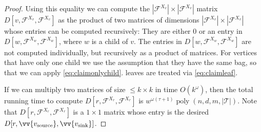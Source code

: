 \documentclass[10pt,a4paper]{article}
\numberwithin{equation}{section}
\theoremstyle{definition}
\newcommand{\CT}{\mathcal{T}}
\newcommand{\CF}{\mathcal{F}}
\DeclareMathOperator{\poly}{poly}
\begin{document}
\begin{proof}
Using this equality we can compute the $|\CF^{X_v}|\times|\CF^{X_v}|$ matrix $D[v,\CF^{X_v},\CF^{X_v}]$ as the product of two matrices of dimensions $|\CF^{X_v}|\times|\CF^{X_v}|$ whose entries can be computed recursively: They are either 0 or an entry in $D[w,\CF^{X_w},\CF^{X_w}]$, where $w$ is a child of $v$. The entries in $D[w,\CF^{X_w},\CF^{X_w}]$ are not computed individually, but recursively as a product of matrices.
For vertices that have only one child we use the assumption that they have the same bag, so that we can apply \eqref{eq:claimonlychild}. leaves are treated via \eqref{eq:claimleaf}.

If we can multiply two matrices of size $\leq k \times k$ in time $O(k^\omega)$, then the total running time to compute $D[r,\CF^{X_r},\CF^{X_r}]$ is $w^{\omega(\tau+1)}\poly(n,d,m, |\CT|)$. Note that $D[r,\CF^{X_r},\CF^{X_r}]$ is a $1 \times 1$ matrix whose entry is the desired $D[r,\vv{v_{\textup{source}}}, \vv{v_{\textup{sink}}}]$.
\end{proof}

%
%
%
%
%
%
%
%
%
%
%
%
%
%
%
%
%
%
%
%
%
%
%
%
%
%
%
%
%
%
%
%
%
%
%
%
%
%
%
%
%
%
%
%
%
%
%
%
%
%
%
%
%
%
%
%
%
%
%
%
%
%
%
%
%
%
%
%
%
%
%
%
%
%
%
%
%
%
%
%
%
%
%
%
%
%
%
%
%
%
%
%
%
%
%
%
%
%
\end{document}
